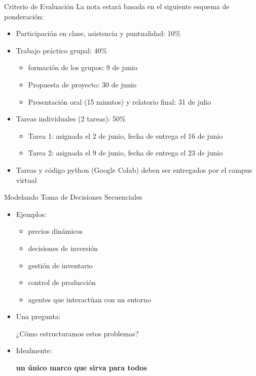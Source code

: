 \documentclass{beamer}
\begin{document}
\begin{frame}{Criterio de Evaluación}
La nota estará basada en el siguiente esquema de ponderación: 
\begin{itemize}
\item Participación en clase, asistencia y puntualidad: 10\%
\item<2-> Trabajo práctico grupal: 40\% 
\begin{itemize}
\item<3-> formación de los grupos: 9 de junio 
\item<3-> Propuesta de proyecto: 30 de junio
\item<3-> Presentación oral (15 minutos) y relatorio final: 31 de julio
\end{itemize}
\item<4-> Tareas individuales (2 tareas): 50\%
\begin{itemize}
\item<5-> Tarea 1: asignada el 2 de junio, fecha de entrega el 16 de junio
\item<5-> Tarea 2: asignada el 9 de junio, fecha de entrega el 23 de junio
\end{itemize}
\item<6-> Tareas y código python (Google Colab) deben ser entregados por el campus virtual
\end{itemize}
\end{frame}

\begin{frame}{Modelando Toma de Decisiones Secuenciales}
\begin{itemize}
\item<1-> Ejemplos:
\begin{itemize}
\item precios dinámicos
\item decisiones de inversión
\item gestión de inventario
\item control de producción
\item agentes que interactúan con un entorno
\end{itemize}
\item<2->Una pregunta:
\begin{center}
¿Cómo estructuramos estos problemas?
\end{center}
\item<3-> Idealmente:
\begin{center}
\Large
\textbf{un único marco que sirva para todos}
\end{center}
\end{itemize}
\end{frame}
\end{document}
